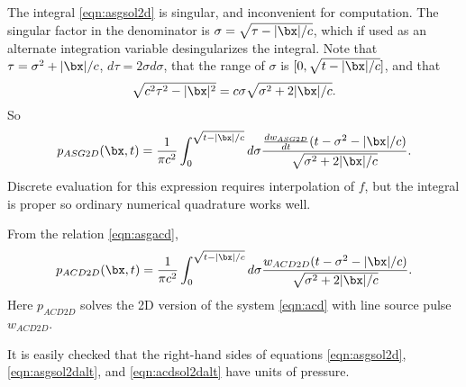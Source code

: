 The integral \ref{eqn:asgsol2d} is singular, and inconvenient for computation. The singular factor in the denominator is $\sigma = \sqrt{\tau -|\bx|/c}$, which if used as an alternate integration variable desingularizes the integral. Note that
$\tau = \sigma^2 + |\bx|/c$, $d\tau = 2 \sigma d\sigma$, that the range of $\sigma$ is $[0,\sqrt{t-|\bx|/c}]$, and that
\[
\sqrt{c^2\tau^2-|\bx|^2} = c\sigma \sqrt{\sigma^2 + 2|\bx|/c}.
\]
So
\begin{equation}\label{eqn:asgsol2dalt}
p_{ASG2D}(\bx,t)=\frac{1}{\pi c^2} \int_0^{\sqrt{t-|\bx|/c}}d\sigma \frac{\frac{dw_{ASG2D}}{dt}(t-\sigma^2-|\bx|/c)}{\sqrt{\sigma^2 + 2|\bx|/c}}. 
\end{equation}
Discrete evaluation for this expression requires interpolation of $f$, but the integral is proper so ordinary numerical quadrature works well.

From the relation \ref{eqn:asgacd}, 
\begin{equation}\label{eqn:acdsol2dalt}
p_{ACD2D}(\bx,t)=\frac{1}{\pi c^2} \int_0^{\sqrt{t-|\bx|/c}}d\sigma \frac{w_{ACD2D}(t-\sigma^2-|\bx|/c)}{\sqrt{\sigma^2 + 2|\bx|/c}}. 
\end{equation}
Here $p_{ACD2D}$ solves the 2D version of the system \ref{eqn:acd} with line source pulse $w_{ACD2D}$.

It is easily checked that the right-hand sides of equations \ref{eqn:asgsol2d}, \ref{eqn:asgsol2dalt}, and \ref{eqn:acdsol2dalt} have units of pressure.

